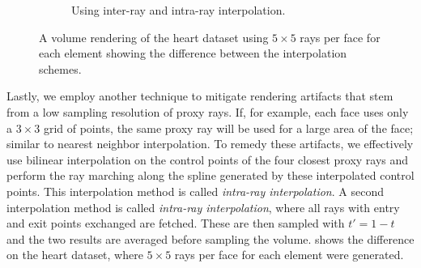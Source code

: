 \begin{figure}
\begin{subfigure}[b]{0.4\textwidth}
    \caption{Using inter-ray and intra-ray interpolation.}
    \label{contributions:fem:interpolation}
\end{subfigure}
\caption{A volume rendering of the heart dataset using $5\times 5$ rays per face for each element showing the difference between the interpolation schemes.}
\label{contributions:fem:interpolationexample}
\end{figure}

Lastly, we employ another technique to mitigate rendering artifacts that stem from a low sampling resolution of proxy rays.  If, for example, each face uses only a $3 \times 3$ grid of points, the same proxy ray will be used for a large area of the face; similar to nearest neighbor interpolation.  To remedy these artifacts, we effectively use bilinear interpolation on the control points of the four closest proxy rays and perform the ray marching along the spline generated by these interpolated control points.  This interpolation method is called \emph{intra-ray interpolation}.  A second interpolation method is called \emph{intra-ray interpolation}, where all rays with entry and exit points exchanged are fetched.  These are then sampled with $t' = 1-t$ and the two results are averaged before sampling the volume.  shows the difference on the heart dataset, where $5\times 5$ rays per face for each element were generated.


